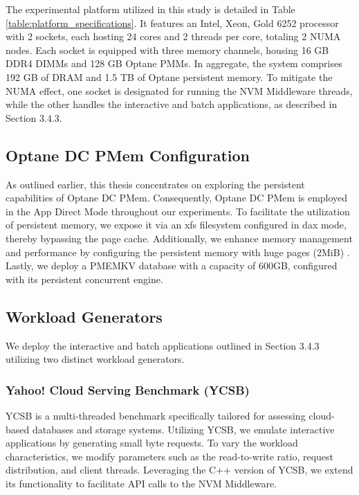 The experimental platform utilized in this study is detailed in Table \ref{table:platform_specifications}. It features an Intel,\textsuperscript{\tiny\textregistered} Xeon,\textsuperscript{\tiny\textregistered} Gold 6252 processor with 2 sockets, each hosting 24 cores and 2 threads per core, totaling 2 NUMA nodes. Each socket is equipped with three memory channels, housing 16 GB DDR4 DIMMs and 128 GB Optane PMMs. In aggregate, the system comprises 192 GB of DRAM and 1.5 TB of Optane persistent memory. To mitigate the NUMA effect, one socket is designated for running the NVM Middleware threads, while the other handles the interactive and batch applications, as described in Section 3.4.3.

\subsection{Optane DC PMem Configuration}
As outlined earlier, this thesis concentrates on exploring the persistent capabilities of Optane DC PMem. Consequently, Optane DC PMem is employed in the App Direct Mode throughout our experiments. To facilitate the utilization of persistent memory, we expose it via an xfs filesystem configured in dax mode, thereby bypassing the page cache. Additionally, we enhance memory management and performance by configuring the persistent memory with huge pages (2MiB) \cite{Speeding28:online}. Lastly, we deploy a PMEMKV database with a capacity of 600GB, configured with its persistent concurrent engine.

\subsection{Workload Generators}

We deploy the interactive and batch applications outlined in Section 3.4.3 utilizing two distinct workload generators.

\subsubsection{Yahoo! Cloud Serving Benchmark (YCSB)}

YCSB \cite{GitHubba9:online} is a multi-threaded benchmark specifically tailored for assessing cloud-based databases and storage systems. Utilizing YCSB, we emulate interactive applications by generating small byte requests. To vary the workload characteristics, we modify parameters such as the read-to-write ratio, request distribution, and client threads. Leveraging the C++ version of YCSB, we extend its functionality to facilitate API calls to the NVM Middleware.

